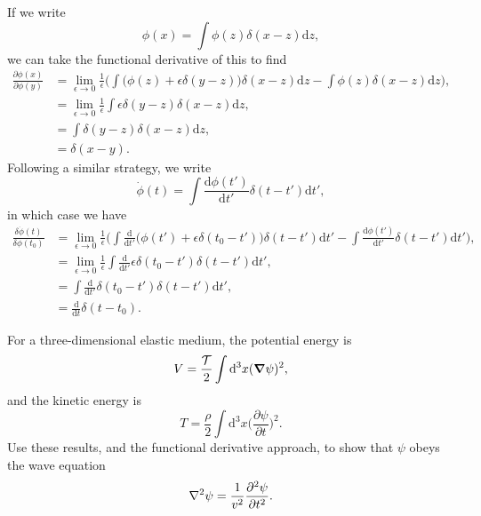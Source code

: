 \documentclass[../qft-for-the-gifted-amateur.tex]{subfiles}
\begin{document}
\begin{questions}
	\begin{solution}
		If we write
		\[
			\phi(x) = \int\phi(z)\delta(x - z)\mathrm{d}z,
		\]
		we can take the functional derivative of this to find
		\begin{align*}
			\frac{\partial\phi(x)}{\partial\phi(y)} &= \lim_{\epsilon\to0}\frac{1}{\epsilon}\Big(\int\big(\phi(z) + \epsilon\delta(y - z)\big)\delta(x - z)\mathrm{d}z - \int\phi(z)\delta(x - z)\mathrm{d}z\Big), \\
			&= \lim_{\epsilon\to0}\frac{1}{\epsilon}\int \epsilon\delta(y - z)\delta(x - z)\mathrm{d}z, \\
			&= \int\delta(y - z)\delta(x - z)\mathrm{d}z, \\
			&= \delta(x - y).
		\end{align*}
		Following a similar strategy, we write
		\[
			\dot\phi(t) = \int \frac{\mathrm{d}\phi(t')}{\mathrm{d}t'}\delta(t - t')\mathrm{d}t',
		\]
		in which case we have
		\begin{align*}
			\frac{\delta\dot{\phi}(t)}{\delta\phi(t_0)} &= \lim_{\epsilon\to0}\frac{1}{\epsilon}\Big(\int \frac{\mathrm{d}}{\mathrm{d}t'}\big(\phi(t') + \epsilon\delta(t_0 - t')\big)\delta(t - t')\mathrm{d}t' - \int \frac{\mathrm{d}\phi(t')}{\mathrm{d}t'}\delta(t - t')\mathrm{d}t'\Big), \\
			&= \lim_{\epsilon\to0}\frac{1}{\epsilon}\int\frac{\mathrm{d}}{\mathrm{d}t'}\epsilon\delta(t_0 - t')\delta(t - t')\mathrm{d}t', \\
			&= \int\frac{\mathrm{d}}{\mathrm{d}t'}\delta(t_0-t')\delta(t-t')\mathrm{d}t', \\
			&= \frac{\mathrm{d}}{\mathrm{d}t}\delta(t - t_0).
		\end{align*}
	\end{solution}
	
	\question For a three-dimensional elastic medium, the potential energy is 
	\[
		V = \frac{\mathcal{T}}{2}\int\mathrm{d}^3x(\grad{\psi})^2,
	\]
	and the kinetic energy is
	\[
		T = \frac{\rho}{2}\int\mathrm{d}^3x\Big(\frac{\partial\psi}{\partial{t}}\Big)^2.
	\]
	Use these results, and the functional derivative approach, to show that $\psi$ obeys the wave equation
	\[
		\laplacian{\psi} = \frac{1}{v^2}\frac{\partial^2\psi}{\partial{t}^2}.
	\]
	

\end{questions}
\end{document}
